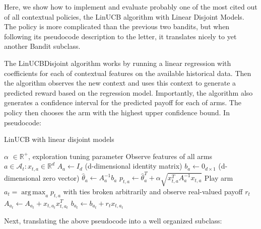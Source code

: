 \documentclass[nojss]{jss}\usepackage[]{graphicx}\usepackage[]{color}
\DeclareMathOperator*{\argmax}{arg\,max}
\begin{document}
Here, we show how to implement and evaluate probably one of the most cited out of all contextual policies, the LinUCB algorithm with Linear Disjoint Models. The policy is more complicated than the previous two bandits, but when following its pseudocode description to the letter, it translates nicely to yet another Bandit subclass.

The LinUCBDisjoint algorithm works by running a linear regression with coefficients for each of  contextual features on the available historical data. Then the algorithm observes the new context and uses this context to generate a predicted reward based on the regression model. Importantly, the algorithm also generates a confidence interval for the predicted payoff for each of  arms. The policy then chooses the arm with the highest upper confidence bound. In pseudocode:

\begin{algorithm}[H]
\caption{LinUCB with linear disjoint models}
\label{Alg:LinUCBDisjoint}
\begin{algorithmic}
\REQUIRE $\alpha$ \(  \in \mathbb{R}^{+} \), exploration tuning parameter
          \STATE Observe features of all arms \(  a \in \mathcal{A}_{t}: x_{t,a} \in \mathbb{R}^{d}\)
		      \STATE \(A_{a} \leftarrow I_{d}  \)  (d-dimensional identity matrix)
		      \STATE \(b_{a} \leftarrow 0_{d\times1}   \) (d-dimensional zero vector)
		\ENDIF
		\STATE \( \hat{\theta}_{a} \leftarrow A_{a}^{-1}b_{a} \)
		\STATE \( p_{t,a} \leftarrow \hat{\theta}_{a}^{T} + \alpha  \sqrt{ x_{t,a}^{T} A_{a}^{-1}x_{t,a}} \)
	\ENDFOR
	\STATE Play arm \(a_t = \argmax_a  p_{t,a}  \) with ties broken arbitrarily and observe real-valued payoff $r_t$
           \STATE \( A_{a_{t}} \leftarrow A_{a_{t}}+ x_{t,a_{t}}x_{t,a_{t}}^{T} \)
           \STATE  \( b_{a_{t}} \leftarrow b_{a_{t}}+ r_{t}x_{t,a_{t}}  \)
\ENDFOR
\end{algorithmic}
\end{algorithm}

Next, translating the above pseudocode into a well organized  subclass:
\end{document}
